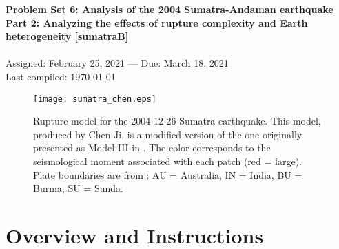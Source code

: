 \documentclass[11pt,titlepage,fleqn]{article}
\begin{document}

\begin{spacing}{1.2} 
\centering
{\large \bf Problem Set 6: Analysis of the 2004 Sumatra-Andaman earthquake \\
Part 2: Analyzing the effects of rupture complexity and Earth heterogeneity [sumatraB]} \\
\cltag\ \\
Assigned: February 25, 2021 --- Due: March 18, 2021 \\
Last compiled: \today
\end{spacing}


\begin{figure}[h]
\centering
\texttt{[image: sumatra\_chen.eps]}
\caption[]
{{
Rupture model for the 2004-12-26  Sumatra earthquake.
This model, produced by Chen Ji, is a modified version of the one originally presented as Model III in \citet[][Figure~5c]{Ammon2005}.
The color corresponds to the seismological moment associated with each patch (red = large).
Plate boundaries are from \citet{Bird2003}: AU = Australia, IN = India, BU = Burma, SU = Sunda.
}}
\label{fig:sumatra_chen}
\end{figure}


\clearpage\pagebreak
\section*{Overview and Instructions}
\end{document}
